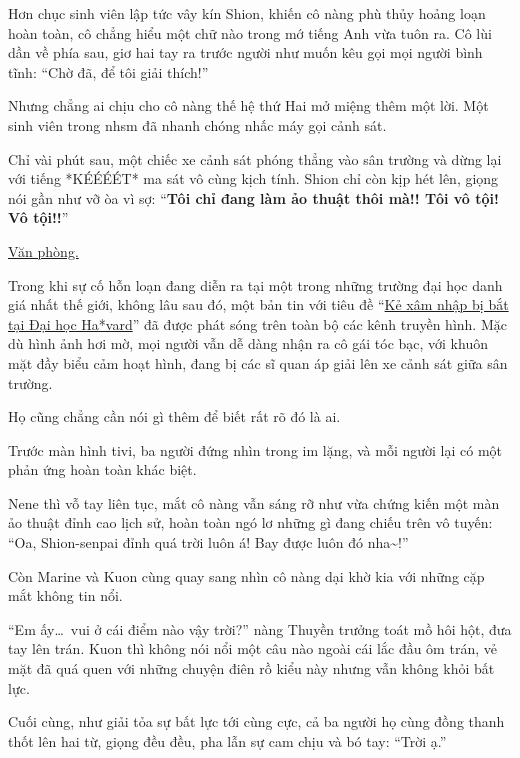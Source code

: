 \documentclass[../main.tex]{subfiles}
\begin{document}
Hơn chục sinh viên lập tức vây kín Shion, khiến cô nàng phù thủy hoảng loạn hoàn toàn, cô chẳng hiểu một chữ nào trong mớ tiếng Anh vừa tuôn ra. Cô lùi dần về phía sau, giơ hai tay ra trước người như muốn kêu gọi mọi người bình tĩnh: ``Chờ đã, để tôi giải thích!''


Nhưng chẳng ai chịu cho cô nàng thế hệ thứ Hai mở miệng thêm một lời. Một sinh viên trong nhsm đã nhanh chóng nhấc máy gọi cảnh sát.

Chỉ vài phút sau, một chiếc xe cảnh sát phóng thẳng vào sân trường và dừng lại với tiếng *KÉÉÉÉT* ma sát vô cùng kịch tính. Shion chỉ còn kịp hét lên, giọng nói gần như vỡ òa vì sợ: ``\textbf{Tôi chỉ đang làm ảo thuật thôi mà!! Tôi vô tội! Vô tội!!}''

\begin{center}
  \uline{Văn phòng.}
\end{center}

Trong khi sự cố hỗn loạn đang diễn ra tại một trong những trường đại học danh giá nhất thế giới, không lâu sau đó, một bản tin với tiêu đề ``\uline{Kẻ xâm nhập bị bắt tại Đại học Ha*vard}'' đã được phát sóng trên toàn bộ các kênh truyền hình. Mặc dù hình ảnh hơi mờ, mọi người vẫn dễ dàng nhận ra cô gái tóc bạc, với khuôn mặt đầy biểu cảm hoạt hình, đang bị các sĩ quan áp giải lên xe cảnh sát giữa sân trường.

Họ cũng chẳng cần nói gì thêm để biết rất rõ đó là ai.

Trước màn hình tivi, ba người đứng nhìn trong im lặng, và mỗi người lại có một phản ứng hoàn toàn khác biệt.


Nene thì vỗ tay liên tục, mắt cô nàng vẫn sáng rỡ như vừa chứng kiến một màn ảo thuật đỉnh cao lịch sử, hoàn toàn ngó lơ những gì đang chiếu trên vô tuyến: ``Oa, Shion-senpai đỉnh quá trời luôn á! Bay được luôn đó nha\~{}!''

Còn Marine và Kuon cùng quay sang nhìn cô nàng dại khờ kia với những cặp mắt không tin nổi.

``Em ấy\dots\ vui ở cái điểm nào vậy trời?'' nàng Thuyền trưởng toát mồ hôi hột, đưa tay lên trán.  Kuon thì không nói nổi một câu nào ngoài cái lắc đầu ôm trán, vẻ mặt đã quá quen với những chuyện điên rồ kiểu này nhưng vẫn không khỏi bất lực.

Cuối cùng, như giải tỏa sự bất lực tới cùng cực, cả ba người họ cùng đồng thanh thốt lên hai từ, giọng đều đều, pha lẫn sự cam chịu và bó tay: ``Trời ạ.''
\omk
\end{document}
